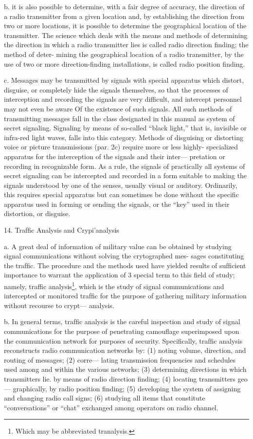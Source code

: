 b. it is also possible to determine, with a fair degree of accuracy, the
direction of a radio transmitter from a given location and, by establishing
the direction from two or more locations, it is possible to determine the
geographical location of the transmitter. The science which deals with
the means and methods of determining the direction in which a radio
transmitter lies is called radio direction ﬁnding; the method of deter-
mining the geographical location of a radio transmitter, by the use of
two or more direction-ﬁnding installations, is called radio position
ﬁnding.

c. Messages may be transmitted by signals with special apparatus
which distort, disguise, or completely hide the signals themselves, so that
the processes of interception and recording the signals are very difficult,
and intercept personnel may not even be aware Of the existence of such
signals. All such methods of transmitting messages fall in the class
designated in this manual as system of secret signaling. Signaling by
means of so-called “black light,” that is, invisible or infra-red light
waves, falls into this category. Methods of disguising or distorting
voice or picture transmissions (par. 2c) require more or less highly-
specialized apparatus for the interception of the signals and their inter—
pretation or recording in recognizable form. As a rule, the signals of
practically all systems of secret signaling can be intercepted and recorded
in a form suitable to making the signals understood by one of the senses,
usually visual or auditory. Ordinarily, this requires special apparatus
but can sometimes be done without the speciﬁc apparatus used in forming
or sending the signals, or the “key” used in their distortion, or disguise.

14. Trafﬁc Analysis and Crypi'analysis

a. A great deal of information of military value can be obtained by
studying signal communications without solving the crytographed mes-
sages constituting the trafﬁc. The procedure and the methods used have
yielded results of sufﬁcient importance to warrant the application of 3
special term to this ﬁeld of study; namely, traffic analysis\footnote{ Which may be abbreviated tranalysis.  }, which is the
study of signal communications and intercepted or monitored trafﬁc for
the purpose of gathering military information without recourse to crypt—
analysis.

b. In general terms, trafﬁc analysis is the careful inspection and study
of signal communications for the purpose of penetrating camouﬂage
superimposed upon the communication network for purposes of security.
Speciﬁcally, trafﬁc analysis reconstructs radio communication networks
by: (1) noting volume, direction, and routing of messages; (2) corre—
lating transmission frequencies and schedules used among and within the
various networks; (3) determining directions in which transmitters lie.
by means of radio direction ﬁnding; (4) locating transmitters geo—
graphically, by radio position ﬁnding; (5) developing the system of
assigning and changing radio call signs; (6) studying all items that
constitute “conversations” or “chat” exchanged among operators on
radio channel.

